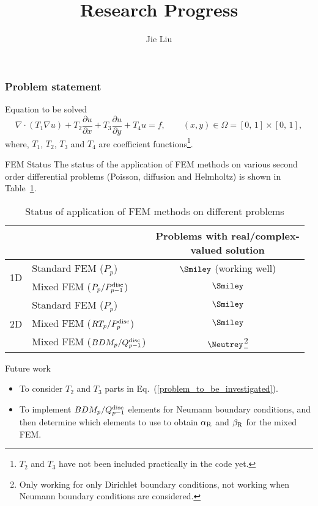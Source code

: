 \documentclass{beamer}
\title[]{Research Progress}
\institute[]{Delft University of Technology, The Netherlands}
\author{Jie Liu}
\begin{document}
{
\frame{\titlepage}
}


\begin{frame}
\frametitle{Problem statement}
\vspace{-8em}
\begin{block}{Equation to be solved}
\scriptsize
\begin{equation}
 \nabla \cdot (T_1 \nabla u) + T_2 \frac{\partial{u}}{\partial{x}} + T_3 \frac{\partial{u}}{\partial{y}} + T_4 u = f,\qquad (x,y) \in \Omega = [0,\,1] \times [0,\,1],
 \label{problem_to_be_investigated}
\end{equation}
where, $T_1$, $T_2$, $T_3$ and $T_4$ are coefficient functions\footnote{$T_2$ and $T_3$ have not been included practically in the code yet.}.
\end{block}
\end{frame}


\begin{frame}{FEM Status}
\vspace{-3em}
The status of the application of FEM methods on various second order differential problems (Poisson, diffusion and Helmholtz) is shown in Table~\ref{table_status_fem_application}.

\begin{table}[!ht]
\scriptsize
\begin{tabular}{l | l | c }
\multicolumn{2}{c|}{} & \makecell{Problems with real/complex-\\valued solution} \\ \hline
\multirow{2}{*}{1D} & Standard FEM ($P_p$) & $\Smiley$ (working well) \\ \cline{2-3}
 & Mixed FEM ($P_p/P_{p-1}^{\rm disc}$) & $\Smiley$ \\ \hline
\multirow{3}{*}{2D} & Standard FEM ($P_p$) & $\Smiley$ \\ \cline{2-3}
 & Mixed FEM ($RT_p/P_{p}^{\rm disc}$) & $\Smiley$ \\ \cline{2-3}
 & Mixed FEM ($BDM_p/Q_{p-1}^{\rm disc}$) & $\Neutrey$\footnote{Only working for only Dirichlet boundary conditions, not working when Neumann boundary conditions are considered.} 
\end{tabular}
\caption{Status of application of FEM methods on different problems}
\label{table_status_fem_application}
\end{table}
\end{frame}


\begin{frame}{Future work}
\vspace{-10em}
\begin{itemize}
 \item To consider $T_2$ and $T_3$ parts in Eq.~(\ref{problem_to_be_investigated}).
 \item To implement $BDM_p/Q_{p-1}^{\rm disc}$ elements for Neumann boundary conditions, and then determine which elements to use to obtain $\alpha_{\rm R}$ and $\beta_{\rm R}$ for the mixed FEM.
\end{itemize}

\end{frame}

\end{document}
